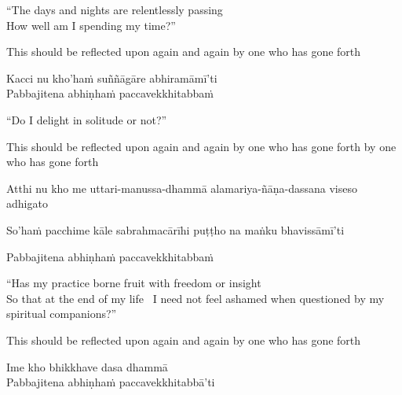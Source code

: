 \begin{english}
  ``The days and nights are relentlessly passing\\
  How well am I spending my time?''\\
\end{english}

\begin{english-hang}
  This should be reflected upon again and again by one who has gone forth
\end{english-hang}

Kacci nu kho'haṁ suññāgāre abhiramāmī'ti\\
Pabbajitena abhiṇhaṁ paccavekkhitabbaṁ

\begin{english}
  ``Do I delight in solitude or not?''\\
\end{english}

\begin{english-hang}
  This should be reflected upon again and again by one who has gone forth by one who has gone forth
\end{english-hang}

\begin{pali-hang}
Atthi nu kho me uttari-manussa-dhammā alamariya-ñāṇa-dassana viseso adhigato\\
\end{pali-hang}

\begin{pali-hang}
So'haṁ pacchime kāle sabrahmacārīhi puṭṭho na maṅku bhavissāmī'ti\\
\end{pali-hang}
\begin{pali-hang}
Pabbajitena abhiṇhaṁ paccavekkhitabbaṁ
\end{pali-hang}

\begin{english}
  ``Has my practice borne fruit with freedom or insight\\
  So that at the end of my life \breathmark\ I need not feel ashamed when questioned by my spiritual companions?''\\
\end{english}

\begin{english-hang}
  This should be reflected upon again and again by one who has gone forth
\end{english-hang}

Ime kho bhikkhave dasa dhammā\\
Pabbajitena abhiṇhaṁ paccavekkhitabbā'ti

